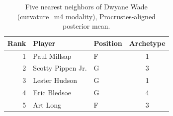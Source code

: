 \begin{table}[htbp]
  \centering\small
  \begin{tabular}{rllc}
    \toprule
    Rank & Player & Position & Archetype \\
    \midrule
    1 & Paul Millsap & F & 1 \\
    2 & Scotty Pippen Jr. & G & 3 \\
    3 & Lester Hudson & G & 1 \\
    4 & Eric Bledsoe & G & 4 \\
    5 & Art Long & F & 3 \\
    \bottomrule
  \end{tabular}
  \caption{Five nearest neighbors of Dwyane Wade (curvature_m4 modality), Procrustes-aligned posterior mean.}
  \label{tab:Dwyane_Wade_neighbors_curvature_m4}
\end{table}

